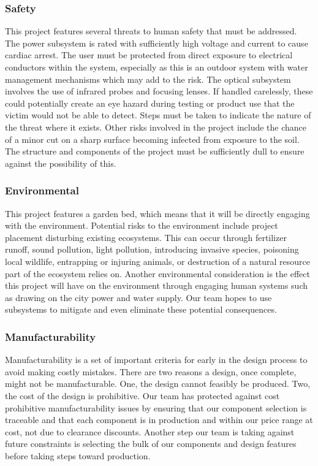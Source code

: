 \subsubsection{Safety}
This project features several threats to human safety that must be addressed. The power subsystem is rated with sufficiently high voltage and current to cause cardiac arrest. The user must be protected from direct exposure to electrical conductors within the system, especially as this is an outdoor system with water management mechanisms which may add to the risk. The optical subsystem involves the use of infrared probes and focusing lenses. If handled carelessly, these could potentially create an eye hazard during testing or product use that the victim would not be able to detect. Steps must be taken to indicate the nature of the threat where it exists. Other risks involved in the project include the chance of a minor cut on a sharp surface becoming infected from exposure to the soil. The structure and components of the project must be sufficiently dull to ensure against the possibility of this. 

\subsubsection{Environmental}
This project features a garden bed, which means that it will be directly engaging with the environment. Potential risks to the environment include project placement disturbing existing ecosystems. This can occur through fertilizer runoff, sound pollution, light pollution, introducing invasive species, poisoning local wildlife, entrapping or injuring animals, or destruction of a natural resource part of the ecosystem relies on. Another environmental consideration is the effect this project will have on the environment through engaging human systems such as drawing on the city power and water supply. Our team hopes to use subsystems to mitigate and even eliminate these potential consequences.

\subsubsection{Manufacturability}
Manufacturability is a set of important criteria for early in the design process to avoid making costly mistakes. There are two reasons a design, once complete, might not be manufacturable. One, the design cannot feasibly be produced. Two, the cost of the design is prohibitive. Our team has protected against cost prohibitive manufacturability issues by ensuring that our component selection is traceable and that each component is in production and within our price range at cost, not due to clearance discounts. Another step our team is taking against future constraints is selecting the bulk of our components and design features before taking steps toward production.  

